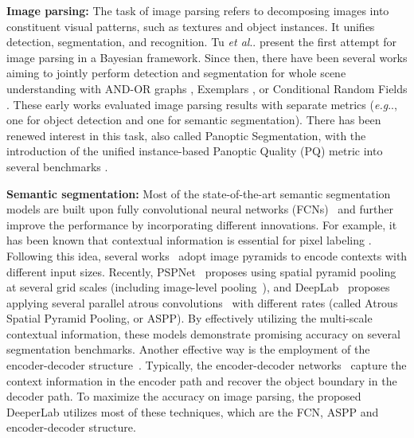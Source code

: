\documentclass[10pt,twocolumn,letterpaper]{article}
\makeatletter
\def\@onedot{\ifx\@let@token.\else.\null\fi\xspace}
\DeclareRobustCommand\onedot{\futurelet\@let@token\@onedot}
\def\eg{\emph{e.g}\onedot} \def\Eg{\emph{E.g}\onedot}
\def\etal{\emph{et al}\onedot}
\makeatother
\begin{document}
{\bf Image parsing:} The task of image parsing refers to decomposing images into constituent visual patterns, such as textures and object instances. It unifies detection, segmentation, and recognition. Tu \etal \cite{tu2005image} present the first attempt for image parsing in a Bayesian framework. Since then, there have been several works aiming to jointly perform detection and segmentation for whole scene understanding with AND-OR graphs \cite{zhu2007stochastic,zhu2012recursive}, Exemplars \cite{malisiewicz2008recognition,tighe2013finding,isola2013scene}, or Conditional Random Fields \cite{rabinovich2007objects,gould2009region,heitz2009cascaded,ladicky2010and,yao2012describing,sun2014relating}. These early works evaluated image parsing results with separate metrics (\eg, one for object detection and one for semantic segmentation). There has been renewed interest in this task, also called Panoptic Segmentation, with the introduction of the unified instance-based Panoptic Quality (PQ) metric \cite{kirillov2018panoptic} into several benchmarks \cite{lin2014microsoft, neuhold2017mapillary}.

{\bf Semantic segmentation:} Most of the state-of-the-art semantic segmentation models are built upon fully convolutional neural networks (FCNs)~\cite{sermanet2013overfeat,long2014fully} and further improve the performance by incorporating different innovations. For example, it has been known that contextual information is essential for pixel labeling \cite{he2004multiscale,shotton2009textonboost,kohli2009robust,ladicky2009associative,gould2009decomposing,mostajabi2014feedforward,dai2015convolutional}. Following this idea, several works~\cite{farabet2013learning,eigen2015predicting,pinheiro2014recurrent,lin2015efficient,chen2015attention,chen2017deeplab} adopt image pyramids to encode contexts with different input sizes. Recently, PSPNet~\cite{zhao2017pyramid} proposes using spatial pyramid pooling~\cite{grauman2005pyramid,lazebnik2006beyond} at several grid scales (including image-level pooling~\cite{liu2015parsenet}), and DeepLab~\cite{chen2017deeplab,chen2017rethinking} proposes applying several parallel atrous convolutions~\cite{holschneider1989real,giusti2013fast,sermanet2013overfeat,papandreou2014untangling,chen2014semantic} with different rates (called Atrous Spatial Pyramid Pooling, or ASPP). By effectively utilizing the multi-scale contextual information, these models demonstrate promising accuracy on several segmentation benchmarks. Another effective way is the employment of the encoder-decoder structure~\cite{ronneberger2015u,badrinarayanan2015segnet,newell2016stacked}. Typically, the encoder-decoder networks~\cite{noh2015learning,ronneberger2015u,badrinarayanan2015segnet,lin2016refinenet,pohlen2016full,peng2017large,islamgated,wojna2017devil,fu2017stacked,deeplabv3plus2018,zhang2018exfuse,xiao2018unified} capture the context information in the encoder path and recover the object boundary in the decoder path. To maximize the accuracy on image parsing, the proposed DeeperLab utilizes most of these techniques, which are the FCN, ASPP and encoder-decoder structure.
\end{document}
